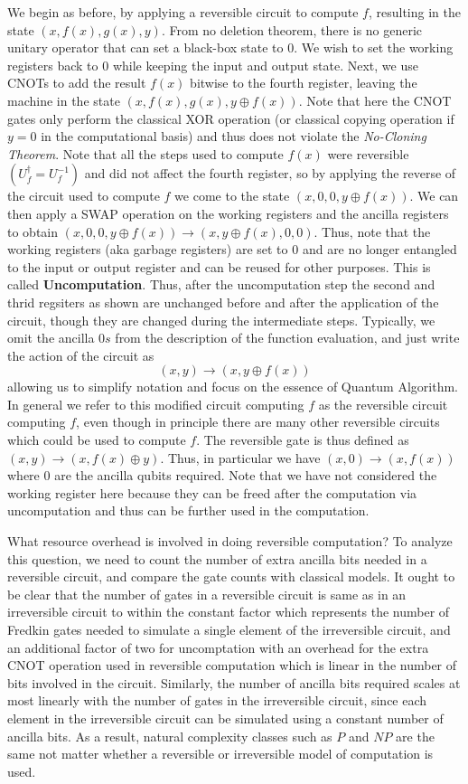 We begin as before, by applying a reversible circuit to compute $f$, resulting in the state $(x,f(x),g(x),y)$. From no deletion theorem, there is no generic unitary operator that can set a black-box state to $0$. We wish to set the working registers back to $0$ while keeping the input and output state. Next, we use CNOTs to add the result $f(x)$ bitwise to the fourth register, leaving the machine in the state $(x,f(x),g(x),y\oplus f(x))$. Note that here the CNOT gates only perform the classical XOR operation (or classical copying operation if $y=0$ in the computational basis) and thus does not violate the \textit{No-Cloning Theorem}. Note that all the steps used to compute $f(x)$ were reversible $(U_f^{\dagger}=U_f^{-1})$ and did not affect the fourth register, so by applying the reverse of the circuit used to compute $f$ we come to the state $(x,0,0,y\oplus f(x))$. We can then apply a SWAP operation on the working registers and the ancilla registers to obtain $(x,0,0,y\oplus f(x))\rightarrow (x,y\oplus f(x),0,0)$. Thus, note that the working registers (aka garbage registers) are set to $0$ and are no longer entangled to the input or output register and can be reused for other purposes. This is called \textbf{Uncomputation}. Thus, after the uncomputation step the second and thrid regsiters as shown are unchanged before and after the application of the circuit, though they are changed during the intermediate steps. Typically, we omit the ancilla $0s$ from the description of the function evaluation, and just write the action of the circuit as
\[
(x,y)\rightarrow (x,y\oplus f(x))
\]
allowing us to simplify notation and focus on the essence of Quantum Algorithm. In general we refer to this modified circuit computing $f$ as the reversible circuit computing $f$, even though in principle there are many other reversible circuits which could be used to compute $f$. The reversible gate is thus defined as $(x,y)\rightarrow (x,f(x)\oplus y)$. Thus, in particular we have $(x,0)\rightarrow (x,f(x))$ where $0$ are the ancilla qubits required. Note that we have not considered the working register here because they can be freed after the computation via uncomputation and thus can be further used in the computation.

What resource overhead is involved in doing reversible computation? To analyze this question, we need to count the number of extra ancilla bits needed in a reversible circuit, and compare the gate counts with classical models. It ought to be clear that the number of gates in a reversible circuit is same as in an irreversible circuit to within the constant factor which represents the number of Fredkin gates needed to simulate a single element of the irreversible circuit, and an additional factor of two for uncomptation with an overhead for the extra CNOT operation used in reversible computation which is linear in the number of bits involved in the circuit. Similarly, the number of ancilla bits required scales at most linearly with the number of gates in the irreversible circuit, since each element in the irreversible circuit can be simulated using a constant number of ancilla bits. As a result, natural complexity classes such as $P$ and $NP$ are the same not matter whether a reversible or irreversible model of computation is used.

